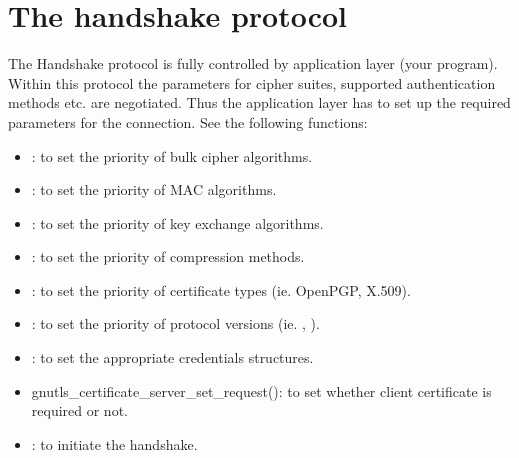 \section{The handshake protocol}

The Handshake protocol is fully controlled by application layer (your 
program). Within this protocol the parameters for cipher suites, supported
authentication methods etc. are negotiated. Thus the application layer
has to set up the required parameters for the connection.
See the following functions:
\begin{itemize}
\item {}:
to set the priority of bulk cipher algorithms.
\item {}:
to set the priority of MAC algorithms.
\item {}:
to set the priority of key exchange algorithms.
\item {}:
to set the priority of compression methods.
\item {}:
to set the priority of certificate types (ie. OpenPGP, X.509).
\item {}:
to set the priority of protocol versions (ie. \sslIII{}, \tlsI).
\item {}: to set the
appropriate credentials structures.
\item {}
{gnutls\_certificate\_server\_set\_request()}: to set
whether client certificate is required or not.
\item {}: to initiate the
handshake.
\end{itemize}



